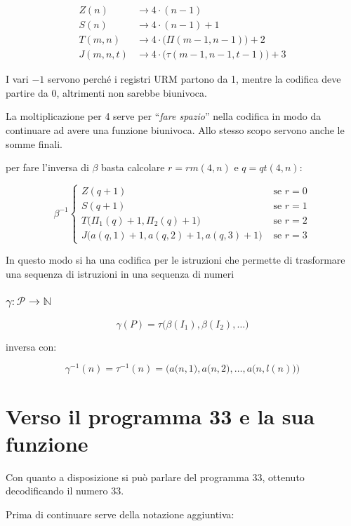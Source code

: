 \begin{align*}
Z(n) &\rightarrow 4\cdot(n-1) \\
S(n) &\rightarrow 4\cdot(n-1)+1 \\ 
T(m,n) &\rightarrow 4\cdot\big(\Pi(m-1,n-1)\big)+2 \\
J(m,n,t) &\rightarrow 4\cdot\big(\tau(m-1,n-1,t-1)\big)+3
\end{align*}

I vari $ -1 $ servono perché i registri URM partono da 1, mentre la codifica deve partire da 0, altrimenti non sarebbe biunivoca.

La moltiplicazione per 4 serve per ``\textit{fare spazio}'' nella codifica in modo da continuare ad avere una funzione biunivoca. Allo stesso scopo servono anche le somme finali.

per fare l'inversa di $ \beta $ basta calcolare $ r = rm(4,n) $ e $ q = qt(4,n) $:

$$
\beta^{-1} \begin{cases}
Z(q+1) &\text{ se } r=0 \\
S(q+1) &\text{ se } r=1 \\
T\big(\Pi_1(q)+1, \Pi_2(q)+1\big) &\text{ se } r=2 \\
J\big(a(q,1)+1,a(q,2)+1,a(q,3)+1\big)&\text{ se } r=3
\end{cases}
$$

In questo modo si ha una codifica per le istruzioni che permette di trasformare una sequenza di istruzioni in una sequenza di numeri

\subsubsection{$ \gamma : \mathcal{P} \rightarrow \mathbb{N} $}

$$
\gamma(P) = \tau\big(\beta(I_1), \beta(I_2), \ldots\big)
$$

inversa con:

$$
\gamma^{-1}(n) = \tau^{-1}(n) = \Big(a\big(n,1\big), a\big(n,2\big), \ldots, a\big(n,l(n)\big)\Big)
$$

\section{Verso il programma 33 e la sua funzione}

Con quanto a disposizione si può parlare del programma 33, ottenuto decodificando il numero 33.

Prima di continuare serve della notazione aggiuntiva:

